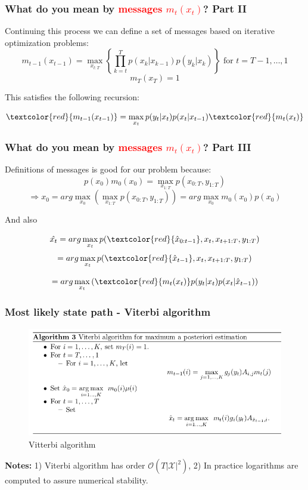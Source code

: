 \documentclass[xcolor=dvipsnames, compress]{beamer}
\begin{document}
\begin{frame}
\frametitle{What do you mean by \textcolor{red}{messages $m_t(x_t)$}? Part II}

Continuing this process we can define a set of messages based on iterative optimization problems:
$$m_{t-1}(x_{t-1}) = \max_{  x_{t:T} }\left\{    \prod_{k=t}^{T} p(x_{k}|x_{k-1}) p(y_{k}|x_{k}) \right\} \mbox{ for } t=T-1, \ldots, 1$$
$$m_T(x_T)=1$$

\vspace{0.3cm}

This satisfies the following recursion:

$$ \textcolor{red}{m_{t-1}(x_{t-1})}  = \max_{  x_{t} } p(y_t | x_t) p(x_t | x_{t-1}) \textcolor{red}{m_t(x_t)}$$

\end{frame}

\begin{frame}
\frametitle{What do you mean by \textcolor{red}{messages $m_t(x_t)$}? Part III}
Definitions of messages is good for our problem because:
$$p(x_0) m_0(x_0) = \max_{x_{1:T}} p(x_{0:T}, y_{1:T})$$
$$\Rightarrow \hat{x_0} = arg \max_{x_0} \left(\max_{x_{1:T}} p(x_{0:T}, y_{1:T}) \right) = arg \max_{x_0} m_0(x_0) p(x_0) $$

And also

$$ \hat{x_t} = arg \max_{x_t} p( \textcolor{red}{ \hat{x}_{0:t-1}}, x_t, x_{t+1:T},y_{1:T} )$$
$$ = arg \max_{x_t} p(\textcolor{red}{\hat{x}_{t-1}}, x_t, x_{t+1:T},y_{1:T} )$$

$$ = arg \max_{x_t} \left(\textcolor{red}{m_t(x_{t})} p(y_t|x_t)  p(x_t | \hat{x}_{t-1})\right) $$

\end{frame}

\begin{frame}
\frametitle{Most likely state path - Viterbi algorithm}
\begin{figure}
	\includegraphics[scale=0.45]{images/viterbi2.jpg}
	\caption{Vitterbi algorithm}
\end{figure}

\textbf{Notes:} 1) Viterbi algorithm has order $\mathcal{O}(T |\mathcal{X}|^2)$, 2) In practice logarithms are computed to assure numerical stability.

\end{frame}
\end{document}
